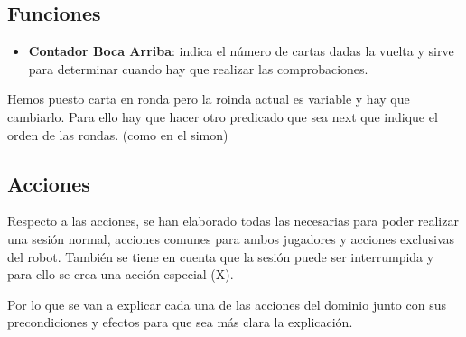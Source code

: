\documentclass{uc3mpracticas}
\begin{document}
  \subsection{Funciones}

  \begin{itemize}
    \item \textbf{Contador Boca Arriba}: indica el número de cartas dadas la vuelta y sirve para determinar cuando hay que realizar las comprobaciones.
  \end{itemize}


  Hemos puesto carta en ronda pero la roinda actual es variable y hay que cambiarlo. Para ello hay que hacer otro predicado que sea next que indique el orden de las rondas. (como en el simon)


  \subsection{Acciones}

  Respecto a las acciones, se han elaborado todas las necesarias para poder realizar una sesión normal, acciones comunes para ambos jugadores y acciones exclusivas del robot. También se tiene en cuenta que la sesión puede ser interrumpida y para ello se crea una acción especial (X).

  \vspace{2mm}

  Por lo que se van a explicar cada una de las acciones del dominio junto con sus precondiciones y efectos para que sea más clara la explicación.
\end{document}
